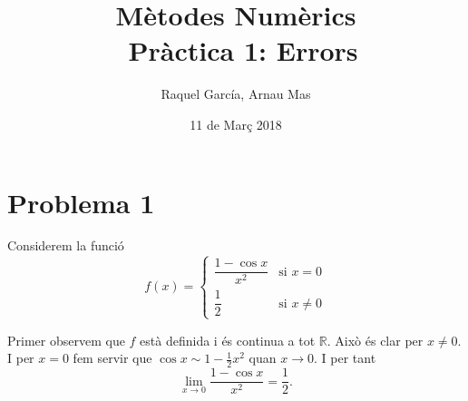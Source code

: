\documentclass[12pt]{article}
\title{\textsf{\textbf{Mètodes Numèrics \\ Pràctica 1:} Errors}}
\author{\textsf{Raquel García, Arnau Mas}}
\date{\textsf{11 de Març 2018}}
\newcommand{\R}{\mathbb{R}}
\begin{document}
\maketitle
\section*{Problema 1}
Considerem la funció
\begin{equation*}
	f(x) =
	\begin{cases}
		\dfrac{1 - \cos{x}}{x^2} & \text{si } x = 0 \\
		\dfrac{1}{2} & \text{si } x \neq 0
	\end{cases}
\end{equation*}

Primer observem que \( f \) està definida i és continua a tot \( \R \). Això és clar per \( x \neq 0 \). I per \( x = 0 \) fem servir que \( \cos{x} \sim 1 - \frac{1}{2} x^2 \) quan \( x \to 0 \). I per tant
\begin{equation*}
	\lim_{x \to 0}{\dfrac{1 - \cos{x}}{x^2}} = \dfrac{1}{2}.
\end{equation*}
\end{document}

